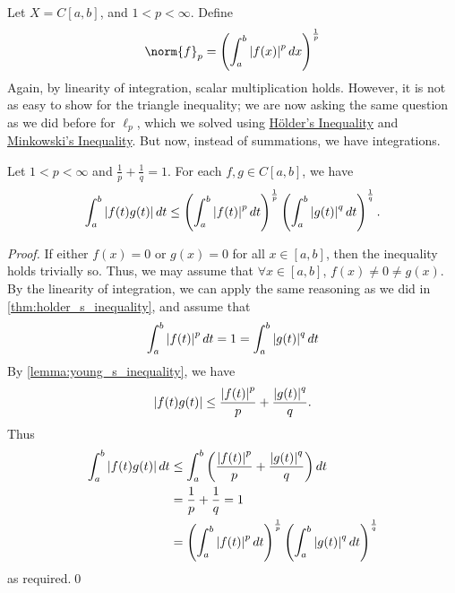 \documentclass[notoc,notitlepage]{tufte-book}
\begin{document}
\begin{eg}
  Let $X = C[a, b]$, and $1 < p < \infty$. Define
  \begin{equation*}
    \norm{f}_p = \left( \int_{a}^{b} \abs{f(x)}^p \dif{x} \right)^{\frac{1}{p}}
  \end{equation*}
  Again, by linearity of integration, scalar multiplication holds. However, it is not as easy to show for the triangle inequality; we are now asking the same question as we did before for $\ell_p$, which we solved using \hyperref[thm:holder_s_inequality]{H\"{o}lder's Inequality} and \hyperref[thm:minkowshi_s_inequality]{Minkowski's Inequality}. But now, instead of summations, we have integrations.
\end{eg}

\begin{thm}\label{thm:holder_s_inequality_v2}
  Let $1 < p < \infty$ and $\frac{1}{p} + \frac{1}{q} = 1$. For each $f, g \in C[a, b]$, we have
  \begin{equation*}
    \int_{a}^{b} \left|f(t)g(t)\right| \mathop{}\!d{t} \leq \left( \int_{a}^{b} \left|f(t)\right|^p \mathop{}\!d{t} \right)^\frac{1}{p} \left( \int_{a}^{b} \left|g(t)\right|^q \mathop{}\!d{t} \right)^\frac{1}{q}.
  \end{equation*}
\end{thm}

\begin{proof}
  If either $f(x) = 0$ or $g(x) = 0$ for all $x \in [a, b]$, then the inequality holds trivially so. Thus, we may assume that $\forall x \in [a, b]$, $f(x) \neq 0 \neq g(x)$. By the linearity of integration, we can apply the same reasoning as we did in \cref{thm:holder_s_inequality}, and assume that
  \begin{equation*}
    \int_{a}^{b} \left|f(t)\right|^p \mathop{}\!d{t} = 1 = \int_{a}^{b} \left|g(t)\right|^q \mathop{}\!d{t} 
  \end{equation*}
  By \cref{lemma:young_s_inequality}, we have
  \begin{equation*}
    \left|f(t) g(t)\right| \leq \frac{\left|f(t)\right|^p}{p} + \frac{\left|g(t)\right|^q}{q}.
  \end{equation*}
  Thus
  \begin{align*}
    \int_{a}^{b} \left|f(t) g(t)\right| \mathop{}\!d{t} &\leq \int_{a}^{b} \left( \frac{\left|f(t)\right|^p}{p} + \frac{\left|g(t)\right|^q}{q} \right) \mathop{}\!d{t} \\
                                         &= \frac{1}{p} + \frac{1}{q} = 1 \\
                                         &= \left( \int_{a}^{b} \left|f(t)\right|^p \mathop{}\!d{t} \right)^\frac{1}{p} \left( \int_{a}^{b} \left|g(t)\right|^q \mathop{}\!d{t} \right)^\frac{1}{q}
  \end{align*}
  as required.\qed
\end{proof}
\end{document}
